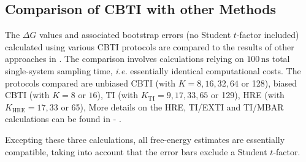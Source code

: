\subsection{Comparison of CBTI with other Methods}


The $\Delta G$ values and associated bootstrap errors (no Student $t$-factor included)
calculated using various CBTI protocols are compared to the 
results of other approaches in .
%
The comparison involves calculations relying on $100\,\mathrm{ns}$ total 
single-system sampling time, {\em i.e.} essentially identical computational costs.
%
The protocols compared are
unbiased CBTI (with $K=8, 16, 32, 64$ or 128),
biased CBTI (with $K=8$ or $16$),
TI (with $K_{\mathrm{TI}}=9, 17, 33, 65$ or 129),
HRE (with $K_{\mathrm{HRE}}=17, 33$ or 65),
%
More details on the HRE, TI/EXTI and TI/MBAR calculations can 
be found in  - .




%
Excepting these three calculations, all free-energy estimates 
are essentially compatible, taking into account that the error bars exclude a
Student $t$-factor.
%


